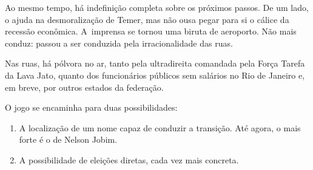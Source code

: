 Ao mesmo tempo, há indefinição completa sobre os próximos passos. De um
lado, o  ajuda na desmoralização de Temer, mas não ousa pegar para
si o cálice da recessão econômica. A~imprensa se tornou uma biruta de
aeroporto. Não mais conduz: passou a ser conduzida pela irracionalidade
das ruas.

Nas ruas, há pólvora no ar, tanto pela ultradireita comandada pela Força
Tarefa da Lava Jato, quanto dos funcionários públicos sem salários no
Rio de Janeiro e, em breve, por outros estados da federação.

O jogo se encaminha para duas possibilidades:

\begin{enumerate}
\itemsep1pt\parskip0pt
\item
  A localização de um nome capaz de conduzir a transição. Até agora, o
  mais forte é o de Nelson Jobim.
\item
  A possibilidade de eleições diretas, cada vez mais concreta.
\end{enumerate}
